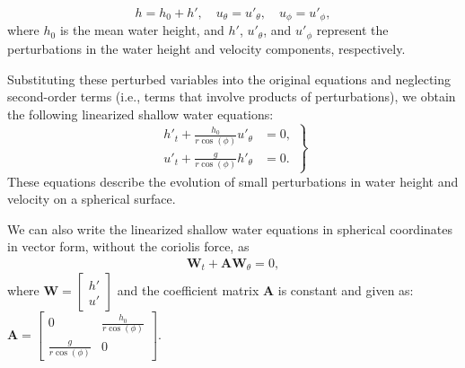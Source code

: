 \[
h = h_0 + h', \quad u_\theta = u'_\theta, \quad u_\phi = u'_\phi,
\]
where \( h_0 \) is the mean water height, and \( h' \), \( u'_\theta \), and \( u'_\phi \) represent the perturbations in the water height and velocity components, respectively.

Substituting these perturbed variables into the original equations and neglecting second-order terms (i.e., terms that involve products of perturbations), we obtain the following linearized shallow water equations:
\begin{equation}\label{eq:linearized_swe_spherical}
    \left.
    \begin{aligned}
        h'_t + \frac{h_0}{r \cos(\phi)} u'_\theta &= 0, \\
        u'_t + \frac{g}{r \cos(\phi)} h'_\theta &= 0.
    \end{aligned}
    \right\}
\end{equation}
These equations describe the evolution of small perturbations in water height and velocity on a spherical surface.


We can also write the linearized shallow water equations in spherical coordinates in vector form, without the coriolis force, as
\begin{align}\label{eq:linearized_swe_spherical_vector}
    \mathbf{W}_t + \mathbf{A} \mathbf{W}_\theta = 0,
\end{align}
where $\mathbf{W} =
\begin{bmatrix} h' \\ u' \end{bmatrix}$ and the coefficient matrix $\mathbf{A}$ is constant and given as:
$\mathbf{A} = \begin{bmatrix} 0 & \frac{h_0}{r \cos(\phi)} \\ \frac{g}{r \cos (\phi)} & 0 \end{bmatrix}$.


